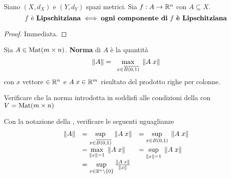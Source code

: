 \begin{proposition}
	Siano $(X,d_X)$ e $(Y,d_Y)$ spazi metrici. Sia $f:A \to \mathbb{R}^n$ con $A \subseteq X$.
	\begin{equation*}
		f \text{ è \textbf{Lipschitziana}} \iff \text{\textbf{ogni componente di} } f \text{ \textbf{è Lipschitziana}}
	\end{equation*}
	\begin{proof}
		Immediata.
	\end{proof}
\end{proposition}

\begin{definition}
	\label{def:norm_matr}
	Sia $A \in \operatorname{Mat} (m \times n)$. \textbf{Norma} di $A$ è la quantità
	\[\norm{A} = \;\; \max\limits_{\raisebox{-1ex}{${\scriptstyle x \in \overline{B(0,1)} }$}} \; \norm{A \; x}\]
	con $x$ vettore $\in \mathbb{R}^n$ e $A \; x \in \mathbb{R}^m$ risultato del prodotto righe per colonne.
\end{definition}
\begin{exercise}
	Verificare che la norma introdotta in  soddisfi alle condizioni della  con $V = \operatorname{Mat} (m \times n)$
\end{exercise}
\begin{exercise}
	\label{ex:matr_form_alt}
	Con la notazione della , verificare le seguenti uguaglianze
	{
	\renewcommand*{\arraystretch}{1.5} %
	\begin{equation*}
		\begin{array}{rll}
			\norm{A}	& =\sup\limits_{\raisebox{-1ex}{${\scriptstyle x \in \overline{B(0,1)} }$}} \; \norm{A \; x}	& =\sup\limits_{x \in B(0,1)} \; \norm{A \; x}\\
						& =\max\limits_{\norm{x} = 1} \; \norm{A \; x}													& =\sup\limits_{\norm{x} = 1} \; \norm{A \; x}\\
						& =\sup\limits_{x \in \R^n \setminus \brackets{0}} \frac{\norm{A \; x}}{\norm{x}}
		\end{array}
	\end{equation*}
	}
\end{exercise}


